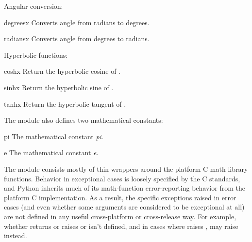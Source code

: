 Angular conversion:

\begin{funcdesc}{degrees}{x}
Converts angle  from radians to degrees.
\end{funcdesc}

\begin{funcdesc}{radians}{x}
Converts angle  from degrees to radians.
\end{funcdesc}

Hyperbolic functions:

\begin{funcdesc}{cosh}{x}
Return the hyperbolic cosine of .
\end{funcdesc}

\begin{funcdesc}{sinh}{x}
Return the hyperbolic sine of .
\end{funcdesc}

\begin{funcdesc}{tanh}{x}
Return the hyperbolic tangent of .
\end{funcdesc}

The module also defines two mathematical constants:

\begin{datadesc}{pi}
The mathematical constant \emph{pi}.
\end{datadesc}

\begin{datadesc}{e}
The mathematical constant \emph{e}.
\end{datadesc}

\begin{notice}
  The  module consists mostly of thin wrappers around
  the platform C math library functions.  Behavior in exceptional cases is
  loosely specified by the C standards, and Python inherits much of its
  math-function error-reporting behavior from the platform C
  implementation.  As a result,
  the specific exceptions raised in error cases (and even whether some
  arguments are considered to be exceptional at all) are not defined in any
  useful cross-platform or cross-release way.  For example, whether
   returns  or raises  or
   isn't defined, and in
  cases where  raises ,
   may raise  instead.
\end{notice}

\begin{seealso}
\end{seealso}
